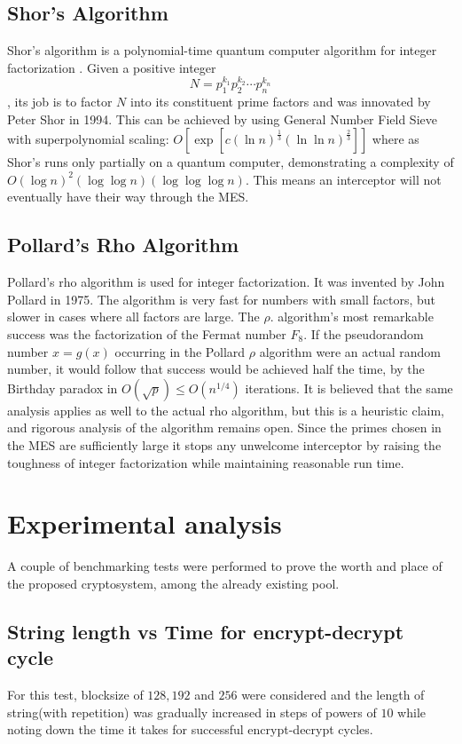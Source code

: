 \subsection{Shor's Algorithm}
\label{subsec:9.1}
Shor's algorithm is a polynomial-time quantum computer algorithm for integer factorization \cite{365700}. Given a positive integer $$N=p_1^{k_1}p_2^{k_2}\cdots p_n^{k_n}$$, its job is to factor $N$ into its constituent prime factors and was innovated by Peter Shor in 1994. This can be achieved by using General Number Field Sieve with superpolynomial scaling: $O\left[\exp\left[c\left(\ln n\right)^\frac{1}{3}\left(\ln\ln n\right)^\frac{2}{3}\right]\right]$ where as Shor's runs only partially on a quantum computer, demonstrating a complexity of $O(\log n)^2(\log\log n)(\log\log\log n)$\cite{miszczak_2015}. This means an interceptor will not eventually have their way through the MES.
\subsection{Pollard's Rho Algorithm}
\label{subsec:9.2}
Pollard's rho algorithm is used for integer factorization. It was invented by John Pollard in 1975. \cite{pollard1974theorems} The algorithm is very fast for numbers with small factors, but slower in cases where all factors are large. The $\rho$. algorithm's most remarkable success was the factorization of the Fermat number $F_8$\cite{pollard1974theorems}. If the pseudorandom number $x=g(x)$ occurring in the Pollard $\rho$ algorithm were an actual random number, it would follow that success would be achieved half the time, by the Birthday paradox in $O({\sqrt{p}})\leq O(n^{1/4})$ iterations. It is believed that the same analysis applies as well to the actual rho algorithm, but this is a heuristic claim, and rigorous analysis of the algorithm remains open. \cite{galbraith201214} Since the primes chosen in the MES are sufficiently large it stops any unwelcome interceptor by raising the toughness of integer factorization while maintaining reasonable run time.

\section{Experimental analysis}
\label{sec:10}
A couple of benchmarking tests were performed to prove the worth and place of the proposed cryptosystem, among the already existing pool.

\subsection{String length vs Time for encrypt-decrypt cycle}
\label{subsec:10.1}
For this test, blocksize of $128,192$ and $256$ were considered and the length of string(with repetition) was gradually increased in steps of powers of $10$ while noting down the time it takes for successful encrypt-decrypt cycles.

